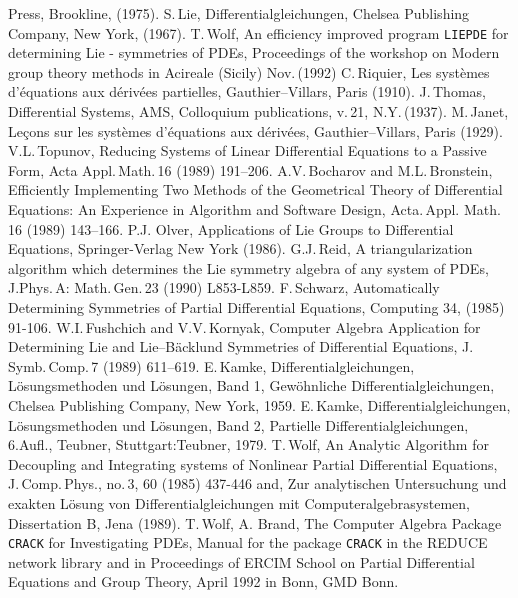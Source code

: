 \documentclass[12pt]{article}
\begin{document}
\begin{thebibliography}{99}
Press, Brookline, (1975).
 S.\,Lie, Differentialgleichungen, Chelsea Publishing Company,
New York, (1967).
 T.\,Wolf, An efficiency improved program {\tt LIEPDE}
for determining Lie - symmetries of PDEs, Proceedings of the workshop on
Modern group theory methods in Acireale (Sicily) Nov.\,(1992)
 C.\,Riquier, Les syst\`{e}mes d'\'{e}quations 
aux d\'{e}riv\'{e}es partielles, Gauthier--Villars, Paris (1910).
 J.\,Thomas, Differential Systems, AMS, Colloquium
publications, v.\,21, N.Y.\,(1937).
 M.\,Janet, Le\c{c}ons sur les syst\`{e}mes d'\'{e}quations aux
d\'{e}riv\'{e}es, Gauthier--Villars, Paris (1929).
 V.L.\,Topunov, Reducing Systems of Linear Differential
Equations to a Passive Form, Acta Appl.\,Math.\,16 (1989) 191--206.
 A.V.\,Bocharov and M.L.\,Bronstein, Efficiently
Implementing Two Methods of the Geometrical Theory of Differential
Equations: An Experience in Algorithm and Software Design, Acta.\,Appl.
Math.\,16 (1989) 143--166.
 P.J. Olver, Applications of Lie Groups to Differential
Equations, Springer-Verlag New York (1986).
 G.J.\,Reid, A triangularization algorithm which
determines the Lie symmetry algebra of any system of PDEs, J.Phys.\,A:
Math.\,Gen.\,23 (1990) L853-L859.
 F.\,Schwarz, Automatically Determining Symmetries of Partial
Differential Equations, Computing 34, (1985) 91-106.
 W.I.\,Fushchich and V.V.\,Kornyak, Computer Algebra
Application for Determining Lie and Lie--B\"{a}cklund Symmetries of
Differential Equations, J.\,Symb.\,Comp.\,7 (1989) 611--619.
 E.\,Kamke, Differentialgleichungen, L\"{o}sungsmethoden
und L\"{o}sungen, Band 1, Gew\"{o}hnliche Differentialgleichungen,
Chelsea Publishing Company, New York, 1959.
 E.\,Kamke, Differentialgleichungen, L\"{o}sungsmethoden
und L\"{o}sungen, Band 2, Partielle Differentialgleichungen, 6.Aufl.,
Teubner, Stuttgart:Teubner, 1979.
 T.\,Wolf, An Analytic Algorithm for Decoupling and Integrating
systems of Nonlinear Partial Differential Equations, J.\,Comp.\,Phys.,
no.\,3, 60 (1985) 437-446 and, Zur analytischen Untersuchung und exakten
L\"{o}sung von Differentialgleichungen mit Computeralgebrasystemen,
Dissertation B, Jena (1989).
 T.\,Wolf, A. Brand, The Computer Algebra Package {\tt CRACK}
      for Investigating PDEs, Manual for the package {\tt CRACK} in the REDUCE
      network library and in Proceedings of ERCIM School on Partial 
      Differential Equations and Group Theory, April 1992 in Bonn, GMD Bonn.

\end{thebibliography}
\end{document}
